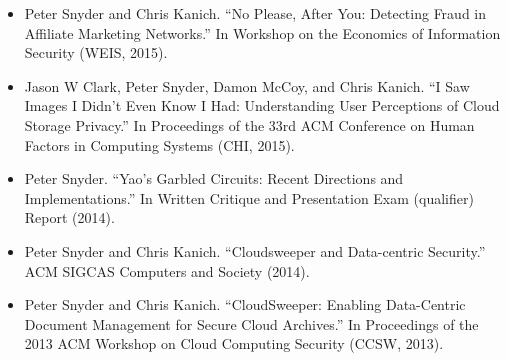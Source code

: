 \begin{singlespace}
\begin{description}[labelwidth=4cm,leftmargin=4.2cm,itemsep=1em]
\begin{itemize}[label={},listparindent=0pt,itemindent=0pt,leftmargin=0pt,itemsep=1em,parsep=0pt,topsep=0pt,partopsep=0pt]
        \item Peter Snyder and Chris Kanich. %
        ``No Please,  After You:  Detecting Fraud in Affiliate Marketing Networks.'' %
        In Workshop on the Economics of Information Security (WEIS, 2015).

        \item Jason W Clark, Peter Snyder, Damon McCoy, and Chris Kanich. %
        ``I Saw Images I Didn’t Even Know I Had: Understanding User Perceptions of Cloud Storage Privacy.'' %
        In Proceedings of the 33rd ACM Conference on Human Factors in Computing Systems (CHI, 2015).

        \item Peter Snyder. %
        ``Yao’s Garbled Circuits: Recent Directions and Implementations.'' %
        In Written Critique and Presentation Exam (qualifier) Report (2014).

        \item Peter Snyder and Chris Kanich. %
        ``Cloudsweeper and Data-centric Security.'' %
        ACM SIGCAS Computers and Society (2014).

        \item Peter Snyder and Chris Kanich. %
        ``CloudSweeper:  Enabling Data-Centric Document Management for Secure Cloud Archives.'' %
        In Proceedings of the 2013 ACM Workshop on Cloud Computing Security (CCSW, 2013).
    \end{itemize}
\end{description}
\end{singlespace}



%
